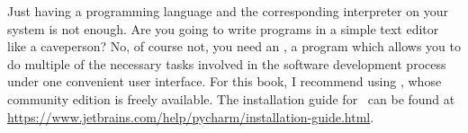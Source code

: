 %
\label{sec:installingPyCharm}%
%
Just having a programming language and the corresponding interpreter on your system is not enough.
Are you going to write programs in a simple text editor like a caveperson?
No, of course not, you need an , a program which allows you to do multiple of the necessary tasks involved in the software development process under one convenient user interface.
For this book, I recommend using \pycharm, whose community edition is freely available.
The installation guide for \pycharm\ can be found at \url{https://www.jetbrains.com/help/pycharm/installation-guide.html}.%
%
%
%
\afterpage{\clearpage}%
\endhsection%
%

